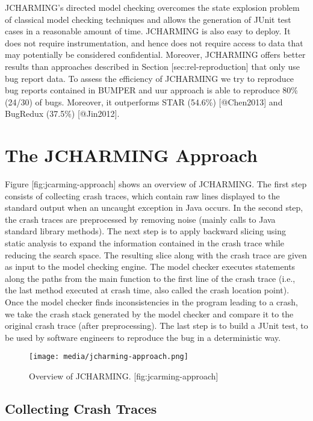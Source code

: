 JCHARMING's directed model checking overcomes the state explosion
problem of classical model checking techniques and allows the generation
of JUnit test cases in a reasonable amount of time. JCHARMING is also
easy to deploy. It does not require instrumentation, and hence does not
require access to data that may potentially be considered confidential.
Moreover, JCHARMING offers better results than approaches described in
Section {[}sec:rel-reproduction{]} that only use bug report data. To
assess the efficiency of {JCHARMING} we try to reproduce bug reports
contained in {BUMPER} and uur approach is able to reproduce 80\% (24/30)
of bugs. Moreover, it outperforms STAR (54.6\%) {[}@Chen2013{]} and
BugRedux (37.5\%) {[}@Jin2012{]}.

\section{The JCHARMING Approach}\label{the-jcharming-approach}

Figure {[}fig:jcarming-approach{]} shows an overview of JCHARMING. The
first step consists of collecting crash traces, which contain raw lines
displayed to the standard output when an uncaught exception in Java
occurs. In the second step, the crash traces are preprocessed by
removing noise (mainly calls to Java standard library methods). The next
step is to apply backward slicing using static analysis to expand the
information contained in the crash trace while reducing the search
space. The resulting slice along with the crash trace are given as input
to the model checking engine. The model checker executes statements
along the paths from the main function to the first line of the crash
trace (i.e., the last method executed at crash time, also called the
crash location point). Once the model checker finds inconsistencies in
the program leading to a crash, we take the crash stack generated by the
model checker and compare it to the original crash trace (after
preprocessing). The last step is to build a JUnit test, to be used by
software engineers to reproduce the bug in a deterministic way.

\begin{figure}[htbp]
\centering
\texttt{[image: media/jcharming-approach.png]}
\caption{Overview of JCHARMING. {[}fig:jcarming-approach{]}}
\end{figure}

\subsection{Collecting Crash Traces}\label{collecting-crash-traces}

